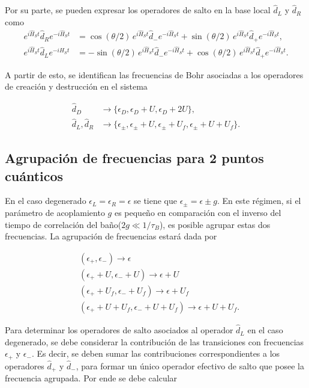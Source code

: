 \begin{appendixs}
Por su parte, se pueden expresar los operadores de salto en la base local $\hat{d}_{L}$ y $\hat{d}_{R}$ como 
\begin{align*}
    e^{i\hat{H}_{S}t}\hat{d}_{R}e^{-i\hat{H}_{S}t} & = \cos(\theta/2)\, e^{i\hat{H}_{S}t}\hat{d}_{-}e^{-i\hat{H}_{S}t} + \sin(\theta/2)\, e^{i\hat{H}_{S}t}\hat{d}_{+}e^{-i\hat{H}_{S}t}, \\
    e^{i\hat{H}_{S}t}\hat{d}_{L}e^{-i\hat{H}_{S}t} & = -\sin(\theta/2)\, e^{i\hat{H}_{S}t}\hat{d}_{-}e^{-i\hat{H}_{S}t} + \cos(\theta/2)\, e^{i\hat{H}_{S}t}\hat{d}_{+}e^{-i\hat{H}_{S}t}.
\end{align*}

A partir de esto, se identifican las frecuencias de Bohr asociadas a los operadores de creación y destrucción en el sistema

\begin{align*}
    \hat{d}_{D} & \rightarrow \{\epsilon_{D}, \epsilon_{D}+U, \epsilon_{D}+2U\}, \\
    \hat{d}_{L}, \hat{d}_{R} & \rightarrow \{\epsilon_{\pm}, \epsilon_{\pm}+U, \epsilon_{\pm}+U_{f}, \epsilon_{\pm}+U+U_{f}\}.
\end{align*}



\label{apendix5jumpop}

\subsection{Agrupación de frecuencias para 2 puntos cuánticos}
En el caso degenerado $\epsilon_{L} = \epsilon_{R}= \epsilon$ se tiene que $\epsilon_{\pm} = \epsilon \pm g$. En este régimen, si el parámetro de acoplamiento $g$ es pequeño en comparación con el inverso del tiempo de correlación del baño($2g\ll 1/\tau_{B}$), es posible agrupar estas dos frecuencias. La agrupación de frecuencias estará dada por 

\begin{align*}
    &(\epsilon_{+},\epsilon_{-})  \to \epsilon \\
    &(\epsilon_{+}+U,\epsilon_{-}+U)  \to \epsilon+U \\
    &(\epsilon_{+}+U_{f},\epsilon_{-}+U_{f})  \to \epsilon+U_{f} \\
    &(\epsilon_{+}+U+U_{f},\epsilon_{-}+U+U_{f})  \to \epsilon+U+U_{f}.
\end{align*}

Para determinar los operadores de salto asociados al operador $\hat{d}_{L}$ en el caso degenerado, se debe considerar la contribución de las transiciones con frecuencias $\epsilon_{+}$ y $\epsilon_{-}$. Es decir, se deben sumar las contribuciones correspondientes a los operadores $\hat{d}_{+}$ y $\hat{d}_{-}$, para formar un único operador efectivo de salto que posee la frecuencia agrupada. Por ende se debe calcular 


\end{appendixs}
